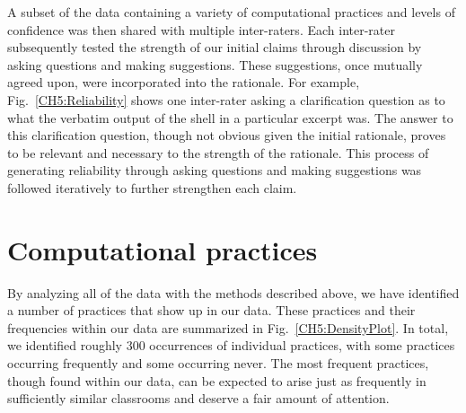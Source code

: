 \documentclass{msuphddissertation}
\begin{document}
\begin{doublespace}
A subset of the data containing a variety of computational practices and levels of confidence was then shared with multiple inter-raters.  Each inter-rater subsequently tested the strength of our initial claims through discussion by asking questions and making suggestions.  These suggestions, once mutually agreed upon, were incorporated into the rationale.  For example, Fig.~\ref{CH5:Reliability} shows one inter-rater asking a clarification question as to what the verbatim output of the shell in a particular excerpt was.  The answer to this clarification question, though not obvious given the initial rationale, proves to be relevant and necessary to the strength of the rationale.  This process of generating reliability through asking questions and making suggestions was followed iteratively to further strengthen each claim.  %

\section{Computational practices}\label{CH5:Practices}

By analyzing all of the data with the methods described above, we have identified a number of practices that show up in our data.  These practices and their frequencies within our data are summarized in Fig.~\ref{CH5:DensityPlot}.  In total, we identified roughly 300 occurrences of individual practices, with some practices occurring frequently and some occurring never.  The most frequent practices, though found within our data, can be expected to arise just as frequently in sufficiently similar classrooms and deserve a fair amount of attention.


\end{doublespace}
\end{document}

